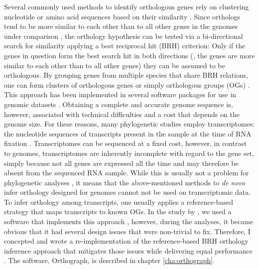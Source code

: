Several commonly used methods to identify orthologous genes rely on
clustering nucleotide or amino acid sequences based on their similarity
\citep{Chen2007a}.  Since orthologs tend to be more similar to each other
than to all other genes in the genomes under comparison
\citep{Altenhoff2012a}, the orthology hypothesis can be tested via a
bi-directional search for similarity applying a best reciprocal hit
(BRH) criterion: Only if the genes in question form the best search hit
in both directions (\ie, the genes are more similar to each other than
to all other genes) they can be assumed to be orthologous.  By grouping
genes from multiple species that share BRH relations, one can form
clusters of orthologous genes or simply orthologous groups (OGs)
\citep{Altenhoff2012}.  This approach has been implemented in several
software packages for use in genomic datasets \citep{Li2003,
Tatusov2003, Berglund2008, Zdobnov2017}.  Obtaining a complete and
accurate genome sequence is, however, associated with technical
difficulties and a cost that depends on the genome size.  For these
reasons, many phylogenetic studies employ transcriptomes: the nucleotide
sequences of transcripts present in the sample at the time of RNA
fixation \citep{Wang2009}.  Transcriptomes can be sequenced at a fixed
cost, however, in contrast to genomes, transcriptomes are inherently
incomplete with regard to the gene set, simply because not all genes are
expressed all the time and may therefore be absent from the sequenced
RNA sample.  While this is usually not a problem for phylogenetic
analyses \citep{Wiens2006}, it means that the above-mentioned methods to
\emph{de novo} infer orthology designed for genomes cannot not be used
on transcriptomic data.  To infer orthology among transcripts, one
usually applies a reference-based strategy that maps transcripts to
known OGs.  In the study by \citet{Misof2014}, we used a software that
implements this approach \citep{Ebersberger2009}, however, during the
analyses, it became obvious that it had several design issues that were
non-trivial to fix.  Therefore, I concepted and wrote a
re-implementation of the reference-based BRH orthology inference
approach that mitigates those issues while delivering equal performance
\citep{Petersen2017}.  The software, Orthograph, is described in chapter
\ref{cha:orthograph}.

